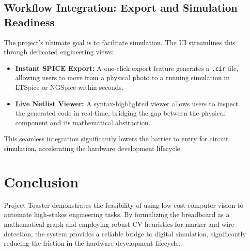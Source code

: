 \documentclass[11pt,a4paper]{article}
\begin{document}
\subsection{Workflow Integration: Export and Simulation Readiness}
The project's ultimate goal is to facilitate simulation. The UI streamlines this through dedicated engineering views:
\begin{itemize}
    \item \textbf{Instant SPICE Export:} A one-click export feature generates a \texttt{.cir} file, allowing users to move from a physical photo to a running simulation in LTSpice or NGSpice within seconds.
    \item \textbf{Live Netlist Viewer:} A syntax-highlighted viewer allows users to inspect the generated code in real-time, bridging the gap between the physical component and its mathematical abstraction.
\end{itemize}
This seamless integration significantly lowers the barrier to entry for circuit simulation, accelerating the hardware development lifecycle.

\section{Conclusion}
Project Toaster demonstrates the feasibility of using low-cost computer vision to automate high-stakes engineering tasks. By formalizing the breadboard as a mathematical graph and employing robust CV heuristics for marker and wire detection, the system provides a reliable bridge to digital simulation, significantly reducing the friction in the hardware development lifecycle.
\end{document}

